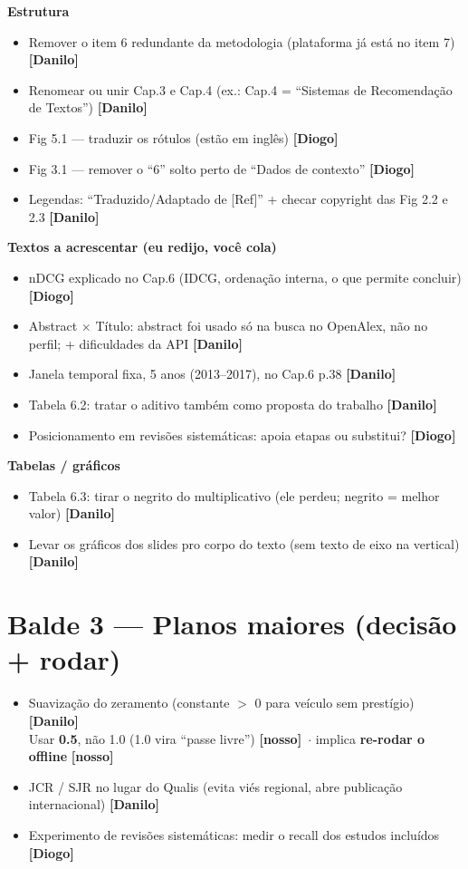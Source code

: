 \documentclass[11pt]{article}
\newcommand{\sub}[1]{\vspace{5pt}\noindent\textbf{\color{muted}#1}\par\vspace{-3pt}}
\newcommand{\tgd}{{\footnotesize\bfseries\color{diogo}[Diogo]}}
\newcommand{\tgn}{{\footnotesize\bfseries\color{danilo}[Danilo]}}
\newcommand{\tgo}{{\footnotesize\bfseries\color{nosso}[nosso]}}
\begin{document}
\sub{Estrutura}
\begin{itemize}[label=$\square$,leftmargin=1.5em,itemsep=2pt,topsep=2pt]
\item Remover o item 6 redundante da metodologia (plataforma já está no item 7) \tgn
\item Renomear ou unir Cap.3 e Cap.4 (ex.: Cap.4 = ``Sistemas de Recomendação de Textos'') \tgn
\item Fig 5.1 --- traduzir os rótulos (estão em inglês) \tgd
\item Fig 3.1 --- remover o ``6'' solto perto de ``Dados de contexto'' \tgd
\item Legendas: ``Traduzido/Adaptado de [Ref]'' + checar copyright das Fig 2.2 e 2.3 \tgn
\end{itemize}

\sub{Textos a acrescentar (eu redijo, você cola)}
\begin{itemize}[label=$\square$,leftmargin=1.5em,itemsep=2pt,topsep=2pt]
\item nDCG explicado no Cap.6 (IDCG, ordenação interna, o que permite concluir) \tgd
\item Abstract $\times$ Título: abstract foi usado só na busca no OpenAlex, não no perfil; + dificuldades da API \tgn
\item Janela temporal fixa, 5 anos (2013--2017), no Cap.6 p.38 \tgn
\item Tabela 6.2: tratar o aditivo também como proposta do trabalho \tgn
\item Posicionamento em revisões sistemáticas: apoia etapas ou substitui? \tgd
\end{itemize}

\sub{Tabelas / gráficos}
\begin{itemize}[label=$\square$,leftmargin=1.5em,itemsep=2pt,topsep=2pt]
\item Tabela 6.3: tirar o negrito do multiplicativo (ele perdeu; negrito = melhor valor) \tgn
\item Levar os gráficos dos slides pro corpo do texto (sem texto de eixo na vertical) \tgn
\end{itemize}

\section{Balde 3 --- Planos maiores (decisão + rodar)}
\begin{itemize}[label=$\square$,leftmargin=1.5em,itemsep=3pt,topsep=2pt]
\item Suavização do zeramento (constante $>$ 0 para veículo sem prestígio) \tgn \\
      {\small\color{muted}Usar \textbf{0.5}, não 1.0 (1.0 vira ``passe livre'') \tgo\ $\cdot$ implica \textbf{re-rodar o offline} \tgo}
\item JCR / SJR no lugar do Qualis (evita viés regional, abre publicação internacional) \tgn
\item Experimento de revisões sistemáticas: medir o recall dos estudos incluídos \tgd
\end{itemize}
\end{document}
